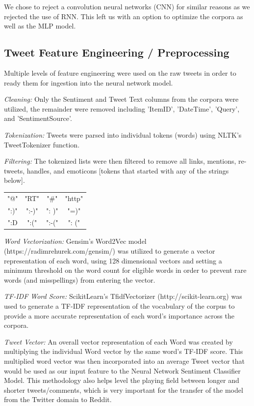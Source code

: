 \documentclass[11pt]{article}
\begin{document}
We chose to reject a convolution neural networks (CNN) for similar reasons 
as we rejected the use of RNN. This left us with an option to optimize the corpora 
as well as the MLP model.

\subsection{Tweet Feature Engineering / Preprocessing}

Multiple levels of feature engineering were used on the raw tweets in order to 
ready them for ingestion into the neural network model.

\textit{Cleaning:} Only the Sentiment and Tweet Text columns from the corpora 
were utilized, the remainder were removed including 'ItemID', 'DateTime', 'Query', 
and 'SentimentSource'.

\textit{Tokenization:} Tweets were parsed into individual tokens (words) using NLTK's TweetTokenizer function. 

\textit{Filtering:} The tokenized lists were then filtered to remove all links, 
mentions, re-tweets, handles, and emoticons [tokens that started with any of the 
strings below].
\begin{center}
 \begin{tabular}{||c c c c||} 
 \hline
 "@"  & "RT" & "\#" & "http" \\ 
 ":)"  & ":-)" & ": )" & "=)" \\ 
 ":D  & ":(" & ":-(" & ": (" \\ [1ex] 
 \hline
\end{tabular}
\end{center}


\textit{Word Vectorization:} Gensim's 
Word2Vec model (https://radimrehurek.com/gensim/) was utilized to generate a vector representation of each word, 
using 128 dimensional vectors and setting a minimum threshold on the word count 
for eligible words in order to prevent rare words (and misspellings) from 
entering the vector. 

\textit{TF-IDF Word Score:} ScikitLearn's TfidfVectorizer (http://scikit-learn.org) 
was used to generate a TF-IDF representation of the vocabulary of the corpus to 
provide a more accurate representation of each word's importance across the corpora. 

\textit{Tweet Vector:} An overall vector representation of each Word was created by
multiplying the individual Word vector by the same word's TF-IDF score. This 
multiplied word vector was then incorporated into an average Tweet vector that would 
be used as our input feature to the Neural Network Sentiment Classifier Model. This 
methodology also helps level the playing field between longer and shorter 
tweets/comments, which is very important for the transfer of the model from the Twitter 
domain to Reddit. 
\end{document}
